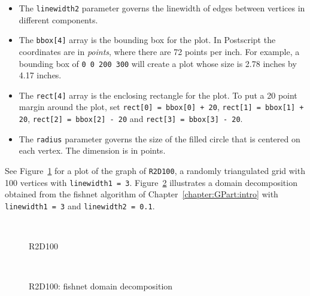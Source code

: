 \begin{enumerate}
\begin{itemize}
\item
The {\tt linewidth2} parameter governs the linewidth of edges
between vertices in different components.
\item
The {\tt bbox[4]} array is the bounding box for the plot.
In Postscript the coordinates are in {\it points}, where there are
72 points per inch.
For example, a bounding box of {\tt 0 0 200 300} will create a plot
whose size is 2.78 inches by 4.17 inches.
\item
The {\tt rect[4]} array is the enclosing rectangle for the plot.
To put a 20 point margin around the plot, set
{\tt rect[0] = bbox[0] + 20},
{\tt rect[1] = bbox[1] + 20},
{\tt rect[2] = bbox[2] - 20} and
{\tt rect[3] = bbox[3] - 20}.
\item
The {\tt radius} parameter governs the size of the filled circle
that is centered on each vertex.
The dimension is in points.
\end{itemize}
See Figure~\ref{fig-R2D100} for a plot of the graph of {\tt R2D100},
a randomly triangulated grid with 100 vertices with {\tt linewidth1
= 3}.
Figure~\ref{fig-R2D100-fishnet} illustrates a domain decomposition
obtained from the fishnet algorithm 
of Chapter~\ref{chapter:GPart:intro} 
with {\tt linewidth1 = 3} and {\tt linewidth2 = 0.1}.
\par
\begin{figure}[htbp]
\caption{{\sc R2D100}}
\label{fig-R2D100}
\begin{center}
\mbox{
}
\end{center}
\end{figure}
\par
\begin{figure}[htbp]
\caption{{\sc R2D100: fishnet domain decomposition}}
\label{fig-R2D100-fishnet}
\begin{center}
\mbox{
}
\end{center}
\end{figure}


\end{enumerate}
